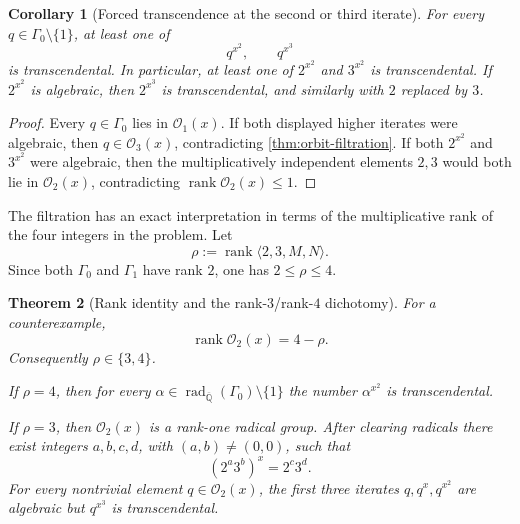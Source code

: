 \documentclass[11pt]{article}
\newtheorem{theorem}{Theorem}[section]
\newtheorem{corollary}[theorem]{Corollary}
\theoremstyle{definition}
\newcommand{\Qbar}{\overline{\mathbb{Q}}}
\newcommand{\rank}{\operatorname{rank}}
\newcommand{\rad}{\operatorname{rad}}
\newcommand{\Gammao}{\Gamma_0}
\newcommand{\Gammai}{\Gamma_1}
\newcommand{\Orb}{\mathcal{O}}
\begin{document}
\begin{corollary}[Forced transcendence at the second or third iterate]
\label{cor:forced-iterate}
For every $q\in\Gammao\setminus\{1\}$, at least one of
\[
             q^{x^2},\qquad q^{x^3}
\]
is transcendental.  In particular, at least one of $2^{x^2}$ and $3^{x^2}$
is transcendental.  If $2^{x^2}$ is algebraic, then $2^{x^3}$ is
transcendental, and similarly with $2$ replaced by $3$.
\end{corollary}

\begin{proof}
Every $q\in\Gammao$ lies in $\Orb_1(x)$.  If both displayed higher iterates
were algebraic, then $q\in\Orb_3(x)$, contradicting
\cref{thm:orbit-filtration}.  If both $2^{x^2}$ and $3^{x^2}$ were algebraic,
then the multiplicatively independent elements $2,3$ would both lie in
$\Orb_2(x)$, contradicting $\rank\Orb_2(x)\leq1$.
\end{proof}

The filtration has an exact interpretation in terms of the multiplicative
rank of the four integers in the problem.  Let
\[
 \rho:=\rank\langle2,3,M,N\rangle.
\]
Since both $\Gammao$ and $\Gammai$ have rank $2$, one has $2\leq\rho\leq4$.

\begin{theorem}[Rank identity and the rank-$3$/rank-$4$ dichotomy]
\label{thm:rank-dichotomy}
For a counterexample,
\[
             \rank\Orb_2(x)=4-\rho.
\]
Consequently $\rho\in\{3,4\}$.

If $\rho=4$, then for every
$\alpha\in\rad_{\Qbar}(\Gammao)\setminus\{1\}$ the number
$\alpha^{x^2}$ is transcendental.

If $\rho=3$, then $\Orb_2(x)$ is a rank-one radical group.  After clearing
radicals there exist integers $a,b,c,d$, with $(a,b)\neq(0,0)$, such that
\[
       (2^a3^b)^x=2^c3^d.
\]
For every nontrivial element $q\in\Orb_2(x)$, the first three iterates
$q,q^x,q^{x^2}$ are algebraic but $q^{x^3}$ is transcendental.
\end{theorem}
\end{document}
